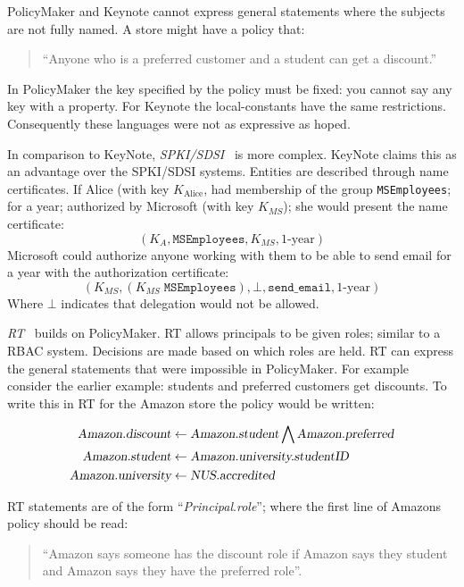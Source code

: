 \documentclass[a4paper,sfsidenotes]{%
  article%
}
\begin{document}
PolicyMaker and Keynote cannot express
general statements where the subjects are not fully named.  A store
might have a policy that:
\begin{quote} ``Anyone who is a
  preferred customer and a student can get a discount.'' 
\end{quote}  
In PolicyMaker the key specified by the policy must be fixed: you cannot say any
key with a property.  For Keynote the local-constants have the same
restrictions.  Consequently these languages were not as expressive as hoped.


In comparison to KeyNote, \emph{SPKI/SDSI}~\cite{Ellison:1999ui} is more
complex.  KeyNote claims this as an advantage over the SPKI/SDSI systems.
Entities are described through name certificates.  If Alice (with key
$K_\text{Alice}$, had membership of the group \texttt{MSEmployees}; for a year;
authorized by Microsoft (with key $K_{MS}$); she would present the name
certificate: \[\left(K_A,\texttt{MSEmployees},K_{MS},\text{1-year}\right)\]
Microsoft could authorize anyone working with them to be able to send email for
a year with the authorization certificate:
\[\left(K_{MS},\left(K_{MS}\;\texttt{MSEmployees}\right),\bot,\texttt{send\_email},\text{1-year}\right)\]
Where $\bot$ indicates that delegation would not be allowed.  

\emph{RT}~\cite{Li:2002if} builds on PolicyMaker. RT allows principals to be
given roles; similar to a \ac{RBAC} system. Decisions are made based on which
roles are held.
RT can express the general statements that were impossible in PolicyMaker.
For example consider the earlier example: students and preferred customers get
discounts. To write this in RT for the Amazon store the policy would be written:

\begin{align*}
  \textsl{Amazon.discount}   & \gets  \textsl{Amazon.student} \bigwedge \textsl{Amazon.preferred} \\
  \textsl{Amazon.student}    & \gets  \textsl{Amazon.university.studentID}                        \\
  \textsl{Amazon.university} & \gets  \textsl{NUS.accredited}                                     \\
\end{align*}

RT statements are of the form ``\textsl{Principal}.\textsl{role}''; where the
first line of Amazons policy should be read: 
\begin{quote}
  ``Amazon says someone has the discount role if Amazon says they student and
  Amazon says  they have the preferred role''.
\end{quote}
\end{document}

